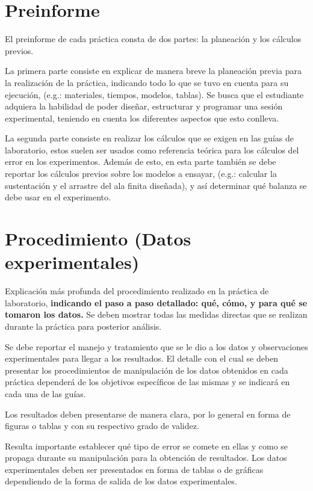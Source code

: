 \documentclass[a4paper]{article}
\begin{document}
\section{Preinforme}
El preinforme de cada práctica consta de dos partes: la planeación y los cálculos previos.

La primera parte consiste en explicar de manera breve la planeación previa para la realización de la práctica, indicando todo lo que se tuvo en cuenta para su ejecución, (e.g.: materiales, tiempos, modelos, tablas). Se busca que el estudiante adquiera la habilidad de poder diseñar, estructurar y programar una sesión experimental, teniendo en cuenta los diferentes aspectos que esto conlleva.

La segunda parte consiste en realizar los cálculos que se exigen en las guías de laboratorio, estos suelen ser usados como referencia teórica para los cálculos del error en los experimentos. Además de esto, en esta parte también se debe reportar los cálculos previos sobre los modelos a ensayar, (e.g.: calcular la sustentación y el arrastre del ala finita diseñada), y así determinar qué balanza se debe usar en el experimento.

\section{Procedimiento (Datos experimentales)}
Explicación más profunda del procedimiento realizado en la práctica de laboratorio, \textbf{indicando el paso a paso detallado: qué, cómo, y para qué se tomaron los datos.} Se deben mostrar todas las medidas directas que se realizan durante la práctica para posterior análisis.

Se debe reportar el manejo y tratamiento que se le dio a los datos y observaciones experimentales para llegar a los resultados. El detalle con el cual se deben presentar los procedimientos de manipulación de los datos obtenidos en cada práctica dependerá de los objetivos específicos de las mismas y se indicará en cada una de las guías.

Los resultados deben presentarse de manera clara, por lo general en forma de figuras o tablas y con su respectivo grado de validez.

 Resulta importante establecer qué tipo de error se comete en ellas y como se propaga durante su manipulación para la obtención de resultados. Los datos experimentales deben ser presentados en forma de tablas o de gráficas dependiendo de la forma de salida de los datos experimentales.
\end{document}
